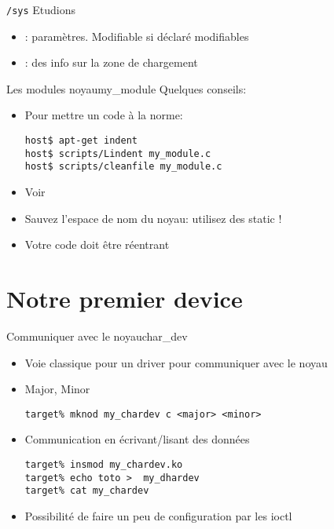 \begin{frame}[fragile=singleslide]{\texttt{/sys}}
  Etudions 
  \begin{itemize}
  \item                       {}:
    paramètres. Modifiable si déclaré modifiables
  \item {}:  des info sur  la zone
    de chargement
  \end{itemize}
\end{frame}

\begin{frame}[fragile=singleslide]{Les modules noyau}{my\_module}
  Quelques conseils:
  \begin{itemize} 
  \item  Pour mettre un code à la norme:
    \begin{lstlisting}
host$ apt-get indent
host$ scripts/Lindent my_module.c
host$ scripts/cleanfile my_module.c
    \end{lstlisting} %
  \item Voir 
  \item Sauvez l'espace de nom du noyau: utilisez des static !
  \item Votre code doit être réentrant
  \end{itemize} 
\end{frame}

\section{Notre premier device}

\begin{frame}[fragile=singleslide]{Communiquer avec le noyau}{char\_dev}
  \begin{itemize}
  \item Voie classique pour un driver pour communiquer avec le noyau
  \item Major, Minor
    \begin{lstlisting}
target% mknod my_chardev c <major> <minor>
    \end{lstlisting}
  \item Communication en écrivant/lisant des données
    \begin{lstlisting}
target% insmod my_chardev.ko
target% echo toto >  my_dhardev
target% cat my_chardev
    \end{lstlisting}
  \item Possibilité de faire un peu de configuration par les ioctl
  \end{itemize}
\end{frame}

